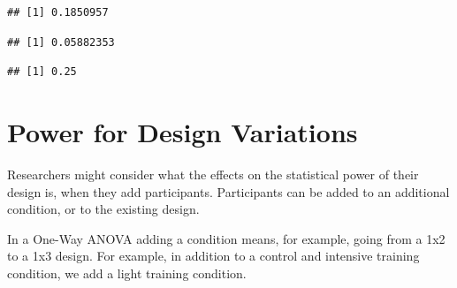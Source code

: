 \documentclass[]{book}
\newenvironment{Shaded}{\begin{snugshade}}{\end{snugshade}}
\newcommand{\CommentTok}[1]{\textcolor[rgb]{0.56,0.35,0.01}{\textit{#1}}}
\newcommand{\DecValTok}[1]{\textcolor[rgb]{0.00,0.00,0.81}{#1}}
\newcommand{\KeywordTok}[1]{\textcolor[rgb]{0.13,0.29,0.53}{\textbf{#1}}}
\newcommand{\NormalTok}[1]{#1}
\newcommand{\OperatorTok}[1]{\textcolor[rgb]{0.81,0.36,0.00}{\textbf{#1}}}
\newcommand{\StringTok}[1]{\textcolor[rgb]{0.31,0.60,0.02}{#1}}
\begin{document}
\begin{Shaded}
\end{Shaded}

\begin{verbatim}
## [1] 0.1850957
\end{verbatim}

\begin{Shaded}
\end{Shaded}

\begin{verbatim}
## [1] 0.05882353
\end{verbatim}

\begin{Shaded}
\end{Shaded}

\begin{verbatim}
## [1] 0.25
\end{verbatim}

\hypertarget{power-for-design-variations}{%
\chapter{Power for Design Variations}\label{power-for-design-variations}}

Researchers might consider what the effects on the statistical power of their design is, when they add participants. Participants can be added to an additional condition, or to the existing design.

In a One-Way ANOVA adding a condition means, for example, going from a 1x2 to a 1x3 design. For example, in addition to a control and intensive training condition, we add a light training condition.
\end{document}
